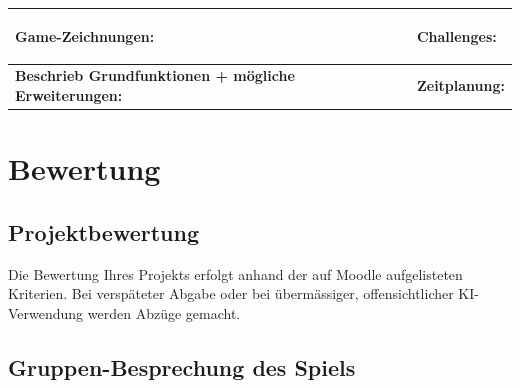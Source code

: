 \begin{landscape}
    \noindent
    \begin{tabularx}{.95\pageheight}{X|X}
        \begin{minipage}[t][0.48\textheight][t]{\linewidth}
            \textbf{Game-Zeichnungen}:
            \begin{center}
                \fbox{\parbox[c][0.2\textheight][c]{0.475\linewidth}{$\;$}}
                \fbox{\parbox[c][0.2\textheight][c]{0.475\linewidth}{$\;$}}
                \fbox{\parbox[c][0.2\textheight][c]{0.475\linewidth}{$\;$}}
                \fbox{\parbox[c][0.2\textheight][c]{0.475\linewidth}{$\;$}}
            \end{center}
        \end{minipage}
         &
        \begin{minipage}[t][0.48\textheight][t]{\linewidth}
            \textbf{Challenges:}
        \end{minipage}
        \\
        \midrule
        \begin{minipage}[t][0.48\textheight][t]{\linewidth}
            \textbf{Beschrieb Grundfunktionen + mögliche Erweiterungen:}

        \end{minipage}
         &
        \begin{minipage}[t][0.48\textheight][t]{\linewidth}
            \textbf{Zeitplanung:}
        \end{minipage}
    \end{tabularx}

    \clearpage
    \begin{minipage}{.7\linewidth}
\section*{Bewertung}
\subsection*{Projektbewertung}
Die Bewertung Ihres Projekts erfolgt anhand der auf Moodle aufgelisteten Kriterien. Bei verspäteter Abgabe oder bei übermässiger, offensichtlicher KI-Verwendung werden Abzüge gemacht.

\subsection*{Gruppen-Besprechung des Spiels}


\end{minipage}
\end{landscape}
